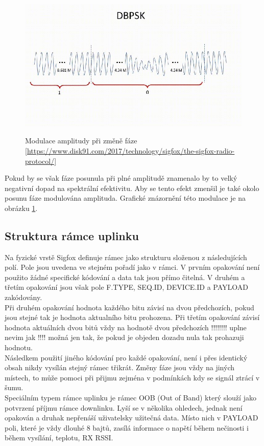 \documentclass{ctuthesis}
\begin{document}
\begin{figure}
\caption{Modulace amplitudy při změně fáze \ref{https://www.disk91.com/2017/technology/sigfox/the-sigfox-radio-protocol/}}
\includegraphics[width=1\textwidth]{./images/dbpsk_sigfox.jpg}
\label{dbpsk_sigfox}
\end{figure}
Pokud by se však fáze posunula při plné amplitudě znamenalo by to velký negativní dopad na spektrální efektivitu. Aby se tento efekt zmenšil je také okolo posunu fáze modulována amplituda. Grafické znázornění této modulace je na obrázku \ref{dbpsk_sigfox}.\\

\subsection{Struktura rámce uplinku}
Na fyzické vrstě Sigfox definuje rámec jako strukturu složenou z následujících polí. Pole jsou uvedena ve stejném pořadí jako v rámci. V prvním opakování není použito žádné specifické kódování a data tak jsou přímo čitelná. V druhém a třetím opakování jsou však pole F.TYPE, SEQ.ID, DEVICE.ID a PAYLOAD zakódovány.\\
Při druhém opakování hodnota každého bitu závisí na dvou předchozích, pokud jsou stejné tak je hodnota aktualního bitu prohozena. Při třetím opakování závisí hodnota aktuálních dvou bitů vždy na hodnotě dvou předchozích !!!!!!!! uplne nevim jak !!!! možná jen tak, že pokud je objeden dozadu nula tak prohazuji hodnotu.\\
Následkem použití jiného kódování pro každé opakování, není i přes identický obsah nikdy vysílán stejný rámec třikrát. Změny fáze jsou vždy na jiných místech, to může pomoci při přijmu zejména v podmínkách kdy se signál ztrácí v šumu.\\
Speciálním typem rámce uplinku je rámec OOB (Out of Band) který slouží jako potvrzení příjmu rámce downlinku. Lyší se v několika ohledech, jednak není opakován a druhak nepřenáší uživatelsky užitečná data. Místo nich v PAYLOAD poli, které je vždy dlouhé 8 bajtů, zasílá informace o napětí během nečinosti i během vysílání, teplotu, RX RSSI.
\end{document}
